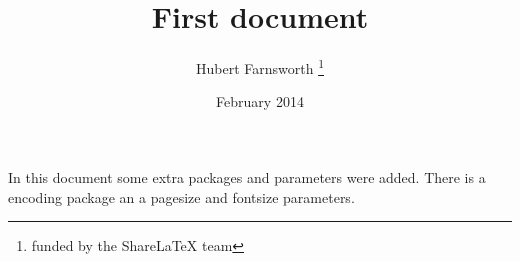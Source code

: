 \documentclass[12pt, a4paper]{article}
\title{First document}
\author{Hubert Farnsworth \thanks{funded by the ShareLaTeX team}}
\date{February 2014}
\begin{document}
	
	\begin{titlepage}
		\maketitle
	\end{titlepage}
	
	In this document some extra packages and parameters
	were added. There is a encoding package
	an a pagesize and fontsize parameters.
	
\end{document}
